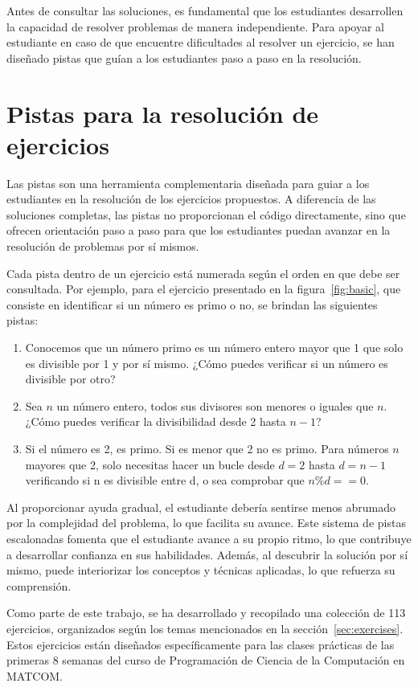 Antes de consultar las soluciones, es fundamental que los estudiantes desarrollen la capacidad de resolver problemas de manera independiente. Para apoyar al estudiante en caso de que encuentre dificultades al resolver un ejercicio, se han diseñado pistas que guían a los estudiantes paso a paso en la resolución.

\section{Pistas para la resolución de ejercicios}

Las pistas son una herramienta complementaria diseñada para guiar a los estudiantes en la resolución de los ejercicios propuestos. A diferencia de las soluciones completas, las pistas no proporcionan el código directamente, sino que ofrecen orientación paso a paso para que los estudiantes puedan avanzar en la resolución de problemas por sí mismos. 

Cada pista dentro de un ejercicio está numerada según el orden en que debe ser consultada. Por ejemplo, para el ejercicio presentado en la figura~\ref{fig:basic}, que consiste en identificar si un número es primo o no, se brindan las siguientes pistas:
\begin{enumerate}
    \item Conocemos que un número primo es un número entero mayor que 1 que solo es divisible por 1 y por sí mismo. ¿Cómo puedes verificar si un número es divisible por otro?
    \item Sea \(n\) un número entero, todos sus divisores son menores o iguales que \(n\). ¿Cómo puedes verificar la divisibilidad desde 2 hasta \(n - 1\)?
    \item Si el número es 2, es primo. Si es menor que 2 no es primo. Para números \(n\) mayores que 2, solo necesitas hacer un bucle desde \(d = 2\) hasta \(d = n -1\) verificando si n es divisible entre d, o sea comprobar que \(n \% d == 0\).
\end{enumerate}

Al proporcionar ayuda gradual, el estudiante debería sentirse menos abrumado por la complejidad del problema, lo que facilita su avance. Este sistema de pistas escalonadas fomenta que el estudiante avance a su propio ritmo, lo que contribuye a desarrollar confianza en sus habilidades. Además, al descubrir la solución por sí mismo, puede interiorizar los conceptos y técnicas aplicadas, lo que refuerza su comprensión.

Como parte de este trabajo, se ha desarrollado y recopilado una colección de 113 ejercicios, organizados según los temas mencionados en la sección~\ref{sec:exercises}. Estos ejercicios están diseñados específicamente para las clases prácticas de las primeras 8 semanas del curso de Programación de Ciencia de la Computación en \mbox{MATCOM}.

